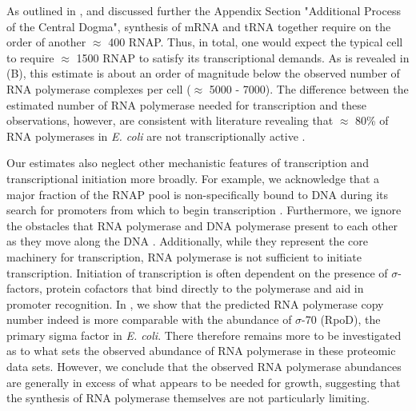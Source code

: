 As outlined in , and discussed further the Appendix
Section "Additional Process of the Central Dogma", synthesis of mRNA and tRNA together require
on the order of another $\approx$ 400 RNAP. Thus, in total, one would expect the
typical cell to require $\approx$ 1500 RNAP to satisfy its transcriptional
demands. As is revealed in (B), this estimate is about an
order of magnitude below the observed number of RNA polymerase complexes per
cell ($\approx$ 5000 - 7000). The difference between the estimated number of
RNA polymerase needed for transcription and these observations, however, are
consistent with literature revealing that $\approx$ 80\% of RNA
polymerases in \textit{E. coli} are not transcriptionally active
\citep{patrick2015}.

Our estimates also neglect other mechanistic features of transcription and
transcriptional initiation more broadly. For example, we acknowledge that a
major fraction of the RNAP pool is non-specifically bound to DNA during its
search for promoters from which to begin transcription \citep{klumpp2008}.
Furthermore, we ignore the obstacles that RNA polymerase and DNA polymerase
present to each other as they move along the DNA \citep{finkelstein2013}.
Additionally, while they represent the core machinery for transcription, RNA
polymerase is not sufficient to initiate transcription. Initiation of
transcription is often dependent on the presence of $\sigma$-factors, protein
cofactors that bind directly to the polymerase \citep{browning2016} and aid in
promoter recognition. In , we show that the
predicted RNA polymerase copy number indeed is more comparable with the
abundance of $\sigma$-70 (RpoD), the primary sigma factor in \textit{E. coli}.
There therefore remains more to be investigated as to what sets the observed
abundance of RNA polymerase in these proteomic data sets. However, we conclude
that the observed RNA polymerase abundances are generally in excess of what
appears to be needed for growth, suggesting that the synthesis of RNA polymerase
themselves are not particularly limiting.


